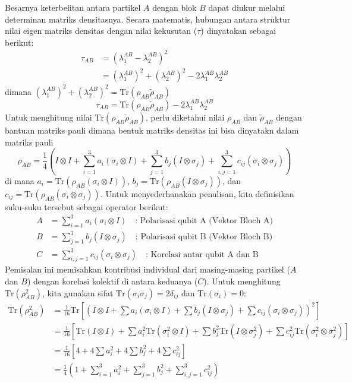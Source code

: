 Besarnya keterbelitan antara partikel $A$ dengan blok $B$  dapat diukur melalui determinan matriks densitasnya. Secara matematis, hubungan antara struktur nilai eigen matriks densitas dengan nilai kekusutan ($\tau$) dinyatakan sebagai berikut:
\begin{align*}
	\tau_{AB} &= (\lambda_1^{AB} - \lambda_2^{AB})^2\\
	& =(\lambda_1^{AB})^2 + (\lambda_2^{AB})^2 - 2 \lambda_1^{AB} \lambda_2^{AB}
\end{align*}
dimana $(\lambda_1^{AB})^2 + (\lambda_2^{AB})^2 = \text{Tr}(\rho_{AB} \tilde{\rho}_{AB})$
\begin{equation*}
	\tau_{AB} =  \text{Tr}(\rho_{AB} \tilde{\rho}_{AB}) - 2 \lambda_1^{AB} \lambda_2^{AB}
\end{equation*}
Untuk menghitung nilai $\text{Tr}(\rho_{AB} \tilde{\rho}_{AB})$, perlu diketahui nilai $\rho_{AB}$ dan $\tilde{\rho}_{AB}$ dengan bantuan
matriks pauli dimana bentuk matriks densitas ini bisa dinyatakn dalam matriks pauli
\begin{equation}
	\rho_{AB} = \frac{1}{4} \left( I \otimes I + \sum_{i=1}^3 a_i (\sigma_i \otimes I) + \sum_{j=1}^3 b_j (I \otimes \sigma_j) + \sum_{i,j=1}^3 c_{ij} (\sigma_i \otimes \sigma_j) \right)
\end{equation}
di mana $a_i = \text{Tr}(\rho_{AB}(\sigma_i \otimes I))$, $b_j = \text{Tr}(\rho_{AB}(I \otimes \sigma_j))$, dan $c_{ij} = \text{Tr}(\rho_{AB}(\sigma_i \otimes \sigma_j))$.
Untuk menyederhanakan penulisan, kita definisikan suku-suku tersebut sebagai operator berikut:
\begin{align*}
	A &= \sum_{i=1}^3 a_i (\sigma_i \otimes I) \quad \text{: Polarisasi qubit A (Vektor Bloch A)} \\
	B &= \sum_{j=1}^3 b_j (I \otimes \sigma_j) \quad \text{: Polarisasi qubit B (Vektor Bloch B)} \\
	C &= \sum_{i,j=1}^3 c_{ij} (\sigma_i \otimes \sigma_j) \quad \text{: Korelasi antar qubit A dan B}
\end{align*}
Pemisalan ini memisahkan kontribusi individual dari masing-masing partikel ($A$ dan $B$) dengan korelasi kolektif di antara keduanya ($C$).
Untuk menghitung $\text{Tr}(\rho_{AB}^2)$, kita gunakan sifat $\text{Tr}(\sigma_i \sigma_j) = 2\delta_{ij}$ dan $\text{Tr}(\sigma_i) = 0$:
\begin{align*}
	\text{Tr}(\rho_{AB}^2) &= \frac{1}{16} \text{Tr} \left[ \left( I \otimes I + \sum a_i (\sigma_i \otimes I) + \sum b_j (I \otimes \sigma_j) + \sum c_{ij} (\sigma_i \otimes \sigma_j) \right)^2 \right] \\
	&= \frac{1}{16} \left[ \text{Tr}(I \otimes I) + \sum a_i^2 \text{Tr}(\sigma_i^2 \otimes I) + \sum b_j^2 \text{Tr}(I \otimes \sigma_j^2) + \sum c_{ij}^2 \text{Tr}(\sigma_i^2 \otimes \sigma_j^2) \right] \\
	&= \frac{1}{16} \left[ 4 + 4 \sum a_i^2 + 4 \sum b_j^2 + 4 \sum c_{ij}^2 \right] \\
	&= \frac{1}{4} \left( 1 + \sum_{i=1}^3 a_i^2 + \sum_{j=1}^3 b_j^2 + \sum_{i,j=1}^3 c_{ij}^2 \right)
\end{align*}


